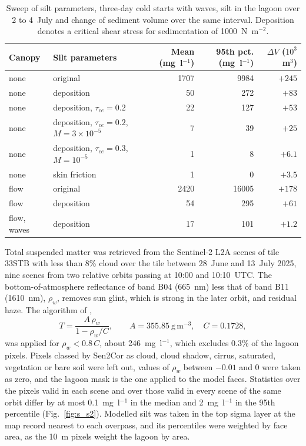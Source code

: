 \documentclass[12pt]{article}
\begin{document}
\begin{table}[H]
  \centering
  \caption{Sweep of silt parameters, three-day cold starts with waves, silt in
  the lagoon over 2 to 4~July and change of sediment volume over the same
  interval. Deposition denotes a critical shear stress for sedimentation of
  1000~N~m$^{-2}$.}
  \label{tab:s_sweep}
  \small
  \begin{tabular}{llrrr}
    \toprule
    Canopy & Silt parameters & Mean (mg~l$^{-1}$) & 95th pct. (mg~l$^{-1}$) & $\Delta V$ ($10^3$~m$^3$) \\
    \midrule
    none        & original                                   & 1707 & 9984 & $+245$ \\
    none        & deposition                                 & 50   & 272  & $+83$ \\
    none        & deposition, $\tau_{ce} = 0.2$              & 22   & 127  & $+53$ \\
    none        & deposition, $\tau_{ce} = 0.2$, $M = 3\times10^{-5}$ & 7 & 39 & $+25$ \\
    none        & deposition, $\tau_{ce} = 0.3$, $M = 10^{-5}$ & 1  & 8    & $+6.1$ \\
    none        & skin friction                              & 1    & 0    & $+3.5$ \\
    flow        & original                                   & 2420 & 16005 & $+178$ \\
    flow        & deposition                                 & 54   & 295  & $+61$ \\
    flow, waves & deposition                                 & 17   & 101  & $+1.2$ \\
    \bottomrule
  \end{tabular}
\end{table}

Total suspended matter was retrieved from the Sentinel-2 L2A scenes of tile
33STB with less than 8\% cloud over the tile between 28~June and 13~July 2025,
nine scenes from two relative orbits passing at 10:00 and 10:10~UTC. The
bottom-of-atmosphere reflectance of band B04 (665~nm) less that of band B11
(1610~nm), $\rho_w$, removes sun glint, which is strong in the later orbit, and
residual haze. The algorithm of \citet{Nechad2010},
\begin{equation}
  T = \frac{A\,\rho_w}{1 - \rho_w / C}, \qquad A = 355.85~\mathrm{g\,m^{-3}},
  \quad C = 0.1728,
\end{equation}
was applied for $\rho_w < 0.8\,C$, about 246~mg~l$^{-1}$, which excludes 0.3\%
of the lagoon pixels. Pixels classed by Sen2Cor as cloud, cloud shadow, cirrus,
saturated, vegetation or bare soil were left out, values of $\rho_w$ between
$-0.01$ and 0 were taken as zero, and the lagoon mask is the one applied to the
model faces. Statistics over the pixels valid in each scene and over those
valid in every scene of the same orbit differ by at most 0.1~mg~l$^{-1}$ in the
median and 2~mg~l$^{-1}$ in the 95th percentile (Fig.~\ref{fig:s_s2}). Modelled
silt was taken in the top sigma layer at the map record nearest to each
overpass, and its percentiles were weighted by face area, as the 10~m pixels
weight the lagoon by area.
\end{document}
